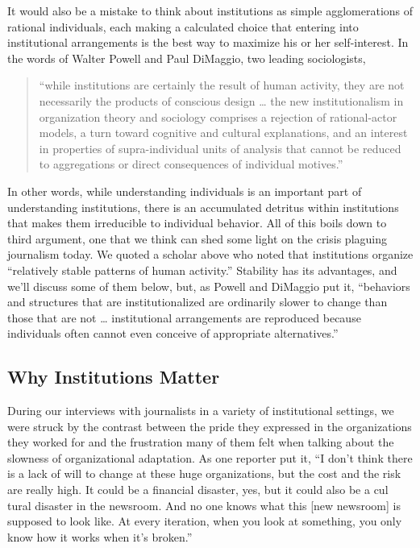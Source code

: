 It would also be a mistake to think about institutions as simple agglomerations
of rational individuals, each making a calculated choice that entering into institutional
arrangements is the best way to maximize his or her self-interest. In
the words of Walter Powell and Paul DiMaggio, two leading sociologists, 
\begin{quote}``while
institutions are certainly the result of human activity, they are not necessarily the
products of conscious design … the new institutionalism in organization theory
and sociology comprises a rejection of rational-actor models, a turn toward cognitive
and cultural explanations, and an interest in properties of supra-individual
units of analysis that cannot be reduced to aggregations or direct consequences of
individual motives.''
\end{quote}

In other words, while understanding individuals is an important
part of understanding institutions, there is an accumulated detritus within
institutions that makes them irreducible to individual behavior.
All of this boils down to third argument, one that we think can shed some light
on the crisis plaguing journalism today. We quoted a scholar above who noted that
institutions organize ``relatively stable patterns of human activity.'' Stability has its
advantages, and we’ll discuss some of them below, but, as Powell and DiMaggio
put it, ``behaviors and structures that are institutionalized are ordinarily slower
to change than those that are not … institutional arrangements are reproduced
because individuals often cannot even conceive of appropriate alternatives.''

\subsection{Why Institutions Matter}

During our interviews with journalists in a variety of institutional settings, we
were struck by the contrast between the pride they expressed in the organizations
they worked for and the frustration many of them felt when talking about
the slowness of organizational adaptation. As one reporter put it, ``I don’t think
there is a lack of will to change at these huge organizations, but the cost and the
risk are really high. It could be a financial disaster, yes, but it could also be a cul tural disaster in the newsroom. And no one knows what this [new newsroom] is supposed to look like. At every iteration, when you look at something, you only know how it works when it’s broken.''

